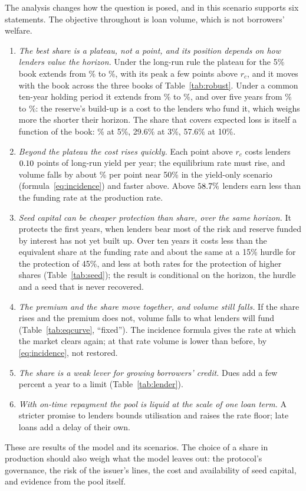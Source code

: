 \documentclass[preprint,11pt,authoryear]{elsarticle}
\theoremstyle{definition}
\begin{document}
The analysis changes how the question is posed, and in this scenario supports six statements. The objective throughout
is loan volume, which is not borrowers' welfare.
\begin{enumerate}
\item \emph{The best share is a plateau, not a point, and its position depends on how lenders value the horizon.} Under the
  long-run rule the plateau for the 5\% book extends from \LoNinetyNine\% to \HiNinetyNine\%, with its peak a few points above $r_c$,
  and it moves with the book across the three books of Table~\ref{tab:robust}. Under a common ten-year holding period it
  extends from \LoNinetyNineHTen\% to \HiNinetyNineHTen\%, and over five years from \LoNinetyNineHFive\% to \HiNinetyNineHFive\%:
  the reserve's build-up is a cost to the lenders who fund it, which weighs more the shorter their horizon.
  The share that covers expected loss is itself a function of the book: \RC\% at 5\%, 29.6\% at 3\%, 57.6\% at 10\%.
\item \emph{Beyond the plateau the cost rises quickly.} Each point above $r_c$ costs lenders $0.10$ points of long-run
  yield per year; the equilibrium rate must rise, and volume falls by about \VolPerPointFifty\% per point near 50\% in the
  yield-only scenario (formula~\eqref{eq:incidence}) and faster above. Above $58.7\%$ lenders earn less than the funding
  rate at the production rate.
\item \emph{Seed capital can be cheaper protection than share, over the same horizon.} It protects the first years, when
  lenders bear most of the risk and reserve funded by interest has not yet built up. Over ten years it costs less than the
  equivalent share at the funding rate and about the same at a 15\% hurdle for the protection of 45\%, and less at both
  rates for the protection of higher shares (Table~\ref{tab:seed}); the result is conditional on the horizon, the hurdle
  and a seed that is never recovered.
\item \emph{The premium and the share move together, and volume still falls.} If the share rises and the premium does not,
  volume falls to what lenders will fund (Table~\ref{tab:eqcurve}, ``fixed''). The incidence formula gives the rate at which
  the market clears again; at that rate volume is lower than before, by \eqref{eq:incidence}, not restored.
\item \emph{The share is a weak lever for growing borrowers' credit.} Dues add a few percent a year to a limit (Table~\ref{tab:lender}).
\item \emph{With on-time repayment the pool is liquid at the scale of one loan term.} A stricter promise to lenders bounds
  utilisation and raises the rate floor; late loans add a delay of their own.
\end{enumerate}
These are results of the model and its scenarios. The choice of a share in production should also weigh what the model leaves out: the
protocol's governance, the risk of the issuer's lines, the cost and availability of seed capital, and evidence from the pool itself.
\end{document}
